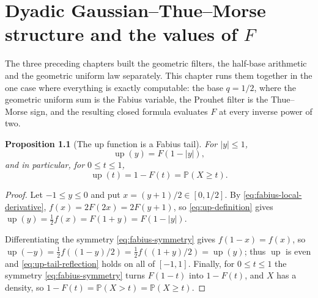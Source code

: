 \documentclass[11pt,oneside,openany]{book}
\newtheorem{proposition}[proposition]{Proposition}
\theoremstyle{definition}
\theoremstyle{remark}
\newcommand{\abs}[1]{\lvert #1\rvert}
\begin{document}
\chapter{Dyadic Gaussian--Thue--Morse structure and the values of \texorpdfstring{$F$}{F}}
\label{chap:dyadic-gaussian-thue-morse}


The three preceding chapters built the geometric filters, the half-base
arithmetic and the geometric uniform law separately.  This chapter runs them
together in the one case where everything is exactly computable: the base
$q=1/2$, where the geometric uniform sum is the Fabius variable, the Prouhet
filter is the Thue--Morse sign, and the resulting closed formula evaluates
$F$ at every inverse power of two.


\begin{proposition}[The up function is a Fabius tail]\label{prop:up-tail}
For $\abs y\le1$,
\begin{equation}\label{eq:up-tail-reflection}
 \operatorname{up}(y)=F(1-\abs y),
\end{equation}
and in particular, for $0\le t\le1$,
\begin{equation}\label{eq:up-survival}
 \operatorname{up}(t)=1-F(t)=\mathbb P(X\ge t).
\end{equation}
\end{proposition}

\begin{proof}
Let $-1\le y\le0$ and put $x=(y+1)/2\in[0,1/2]$.  By
\eqref{eq:fabius-local-derivative}, $f(x)=2F(2x)=2F(y+1)$, so
\eqref{eq:up-definition} gives
$\operatorname{up}(y)=\tfrac12f(x)=F(1+y)=F(1-\abs y)$.

Differentiating the symmetry \eqref{eq:fabius-symmetry} gives $f(1-x)=f(x)$, so
$\operatorname{up}(-y)=\tfrac12f((1-y)/2)=\tfrac12f((1+y)/2)=\operatorname{up}(y)$;
thus $\operatorname{up}$ is even and \eqref{eq:up-tail-reflection} holds on all of
$[-1,1]$.  Finally, for $0\le t\le1$ the symmetry \eqref{eq:fabius-symmetry} turns
$F(1-t)$ into $1-F(t)$, and $X$ has a density, so
$1-F(t)=\mathbb P(X>t)=\mathbb P(X\ge t)$.
\end{proof}
\end{document}
